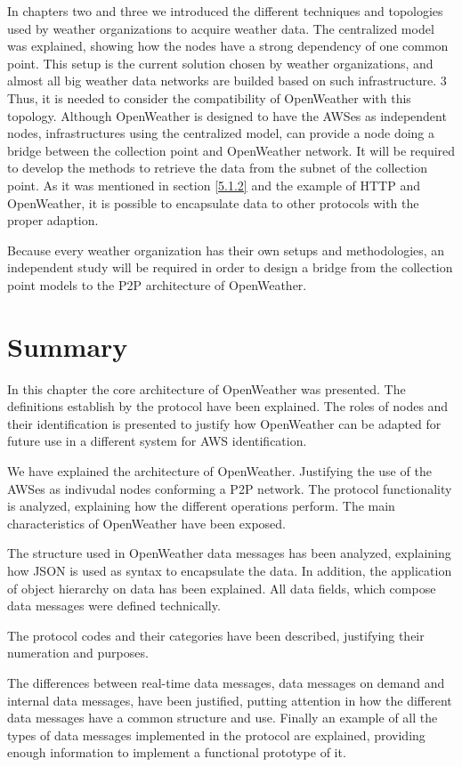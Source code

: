 In chapters two and three we introduced the different techniques and topologies used by weather organizations to acquire weather data. The centralized model was explained, showing how the nodes have a strong dependency of one common point. This setup is the current solution chosen by weather organizations, and almost all big weather data networks are builded based on such infrastructure.
3
Thus, it is needed to consider the compatibility of OpenWeather with this topology. Although OpenWeather is designed to have the \gls{AWS}es as independent nodes, infrastructures using the centralized model, can provide a node doing a bridge between the collection point and OpenWeather network. It will be required to develop the methods to retrieve the data from the subnet of the collection point. As it was mentioned in section \ref{5.1.2} and the example of \gls{HTTP} and OpenWeather, it is possible to encapsulate data to other protocols with the proper adaption.

Because every weather organization has their own setups and methodologies, an independent study will be required in order to design a bridge from the collection point models to the \gls{P2P} architecture of OpenWeather.


\section{Summary}

In this chapter the core architecture of OpenWeather was presented. The definitions establish by the protocol have been explained. 
The roles of nodes and their identification is presented to justify how OpenWeather can be adapted for future use in a different system for \gls{AWS} identification.

We have explained the architecture of OpenWeather. Justifying the use of the \gls{AWS}es as indivudal nodes conforming a \gls{P2P} network. The protocol functionality is analyzed, explaining how the different operations perform. The main characteristics of OpenWeather have been exposed.

The structure used in OpenWeather data messages has been analyzed, explaining how \gls{JSON} is used as syntax to encapsulate the data. In addition, the application of object hierarchy on data has been explained. All data fields, which compose data messages were defined technically. 

The protocol codes and their categories have been described, justifying their numeration and purposes.

The differences between real-time data messages, data messages on demand and internal data messages, have been justified, putting attention in how the different data messages have a common structure and use. Finally an example of all the types of data messages implemented in the protocol are explained, providing enough information to implement a functional prototype of it.



\pagebreak
